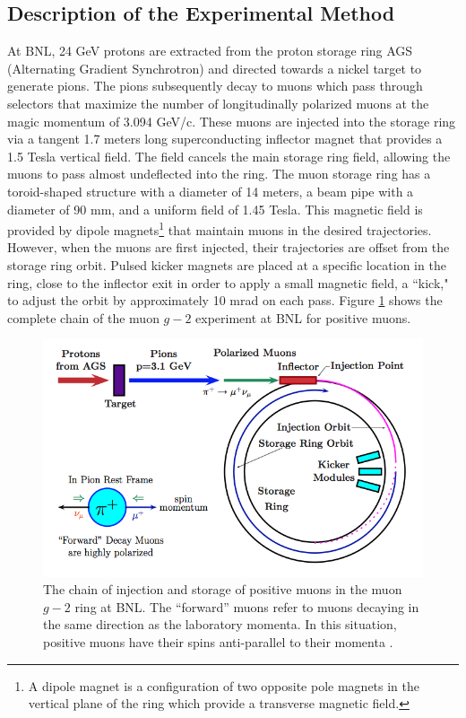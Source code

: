 \documentclass{outhesis}
\begin{document}
\subsection{Description of the Experimental Method}

At BNL, 24 GeV protons are extracted from the proton storage ring AGS (Alternating Gradient Synchrotron) and directed towards a nickel target to generate pions. The pions subsequently decay to muons which pass through selectors that maximize the number of longitudinally polarized muons at the magic momentum of 3.094 GeV/c. These muons are injected into the storage ring via a tangent 1.7 meters long superconducting inflector magnet that provides a 1.5 Tesla vertical field. The field cancels the main storage ring field, allowing the muons to pass almost undeflected into the ring. The muon storage ring has a toroid-shaped structure with a diameter of 14 meters, a beam pipe with a diameter of 90 mm, and a uniform field of 1.45 Tesla. This magnetic field is provided by dipole magnets\footnote{A dipole magnet is a configuration of two opposite pole magnets in the vertical plane of the ring which provide a transverse magnetic field.} that maintain muons in the desired trajectories. However, when the muons are first injected, their trajectories are offset from the storage ring orbit. Pulsed kicker magnets are placed at a specific location in the ring, close to the inflector exit in order to apply a small magnetic field, a ``kick," to adjust the orbit by approximately 10 mrad on each pass. Figure \ref{fig:chain} shows the complete chain of the muon $g-2$ experiment at BNL for positive muons.
 \begin{figure}
    \centering
  \includegraphics[scale=0.39]{figures/chain}
   \caption[Injection chain in the muon $g-2$ experiment]{The chain of injection and storage of positive muons in the muon $g-2$ ring at BNL. The ``forward'' muons refer to muons decaying in the same direction as the laboratory momenta. In this situation, positive muons have their spins anti-parallel to their momenta \cite{phen}.}
  \label{fig:chain}
\end{figure}
\end{document}

